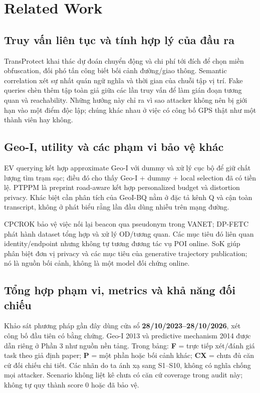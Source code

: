 \section{Related Work}
\subsection{Truy vấn liên tục và tính hợp lý của đầu ra}
TransProtect\cite{transprotect} khai thác dự đoán chuyển động và chi phí tới đích để chọn miền obfuscation,
đối phó tấn công biết bối cảnh đường/giao thông. Semantic correlation\cite{semantic} xét sự nhất quán
ngữ nghĩa và thời gian của chuỗi tập vị trí. Fake queries\cite{fake} chèn thêm tập toàn giả giữa các lần
truy vấn để làm gián đoạn tương quan và reachability. Những hướng này chỉ ra vì sao attacker không nên
bị giới hạn vào một điểm độc lập; chúng khác nhau ở việc có công bố GPS thật như một thành viên hay không.

\subsection{Geo-I, utility và các phạm vi bảo vệ khác}
EV querying\cite{ev} kết hợp approximate Geo-I với dummy và xử lý cục bộ để giữ chất lượng tìm trạm sạc;
điều đó cho thấy Geo-I + dummy + local selection đã có tiền lệ. PTPPM\cite{ptppm} là preprint road-aware
kết hợp personalized budget và distortion privacy. Khác biệt cần phân tích của GeoI-BQ nằm ở đặc tả
kênh Q và cận toàn transcript, không ở phát biểu rằng lần đầu dùng nhiễu trên mạng đường.

CPCROK\cite{cpcrok} bảo vệ việc nối lại beacon qua pseudonym trong VANET; DP-FETC\cite{dpfetc} phát hành
dataset tổng hợp và xử lý OD/tương quan. Các mục tiêu đó liên quan identity/endpoint nhưng không tự
tương đương tác vụ POI online. SoK\cite{sok} giúp phân biệt đơn vị privacy và các mục tiêu của generative
trajectory publication; nó là nguồn bối cảnh, không là một model đối chứng online.

\subsection{Tổng hợp phạm vi, metrics và khả năng đối chiếu}
Khảo sát phương pháp gần đây dùng cửa sổ \textbf{28/10/2023--28/10/2026}, xét công bố đầu tiên có bằng chứng.
Geo-I 2013 và predictive mechanism 2014 được dẫn riêng ở Phần 3 như nguồn nền tảng.
Trong bảng: \textbf{F} = trực tiếp xét/đánh giá task theo giả định paper; \textbf{P} = một phần hoặc bối cảnh khác;
\textbf{CX} = chưa đủ căn cứ đối chiếu chi tiết. Các nhãn do ta ánh xạ sang S1--S10, không có nghĩa chống mọi attacker.
Scenario không liệt kê chưa có căn cứ coverage trong audit này; không tự quy thành score 0 hoặc đã bảo vệ.

